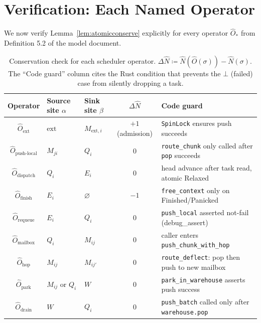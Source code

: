 \documentclass[11pt,a4paper]{article}
\newcommand{\Num}{\hat{N}}
\newcommand{\code}[1]{\texttt{#1}}
\begin{document}
\section{Verification: Each Named Operator}

We now verify Lemma~\ref{lem:atomicconserve} explicitly for every
operator $\hat{O}_*$ from Definition 5.2 of the model document.

\begin{table}[h]
\centering
\small
\caption{Conservation check for each scheduler operator.
$\Delta\Num \coloneqq \Num(\hat{O}(\sigma)) - \Num(\sigma)$.
The ``Code guard'' column cites the Rust condition that prevents the
$\bot$ (failed) case from silently dropping a task.}
\label{tab:conserve}
\begin{tabularx}{\textwidth}{@{}clXcX@{}}
\toprule
Operator & Source site $\alpha$ & Sink site $\beta$
         & $\Delta\Num$ & Code guard \\
\midrule
$\hat{O}_{\text{ext}}$
  & $\text{ext}$ & $M_{\text{ext},i}$
  & $+1$ (admission) & \code{SpinLock} ensures push succeeds \\
$\hat{O}_{\text{push-local}}$
  & $M_{ji}$ & $Q_i$
  & $0$ & \code{route\_chunk} only called after \code{pop} succeeds \\
$\hat{O}_{\text{dispatch}}$
  & $Q_i$ & $E_i$
  & $0$ & head advance after task read, atomic Relaxed \\
$\hat{O}_{\text{finish}}$
  & $E_i$ & $\varnothing$
  & $-1$ & \code{free\_context} only on Finished/Panicked \\
$\hat{O}_{\text{requeue}}$
  & $E_i$ & $Q_i$
  & $0$ & \code{push\_local} asserted not-fail (debug\_assert) \\
$\hat{O}_{\text{mailbox}}$
  & $Q_i$ & $M_{ij}$
  & $0$ & caller enters \code{push\_chunk\_with\_hop} \\
$\hat{O}_{\text{hop}}$
  & $M_{ij}$ & $M_{ij'}$
  & $0$ & \code{route\_deflect}: pop then push to new mailbox \\
$\hat{O}_{\text{park}}$
  & $M_{ij}$ or $Q_i$ & $W$
  & $0$ & \code{park\_in\_warehouse} asserts push success \\
$\hat{O}_{\text{drain}}$
  & $W$ & $Q_i$
  & $0$ & \code{push\_batch} called only after \code{warehouse.pop} \\
\bottomrule
\end{tabularx}
\end{table}
\end{document}
